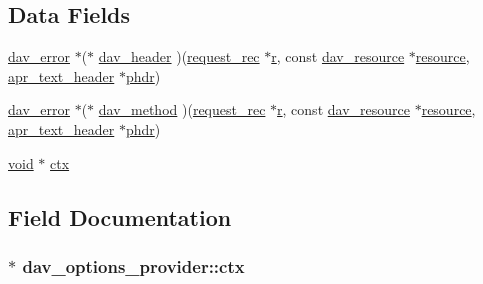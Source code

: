 \subsection*{Data Fields}
\begin{DoxyCompactItemize}
\item 
\hyperlink{structdav__error}{dav\+\_\+error} $\ast$($\ast$ \hyperlink{structdav__options__provider_a3da58aa5f6bc72ca913ff4bd7458c9f2}{dav\+\_\+header} )(\hyperlink{structrequest__rec}{request\+\_\+rec} $\ast$\hyperlink{pcregrep_8txt_a2e9e9438b26c0bb4425367a7e4f75eb3}{r}, const \hyperlink{structdav__resource}{dav\+\_\+resource} $\ast$\hyperlink{group__APR__Util__RL_gaa6244aacafcc4ec1d0727bdb32614b11}{resource}, \hyperlink{structapr__text__header}{apr\+\_\+text\+\_\+header} $\ast$\hyperlink{group__MOD__DAV_ga08f35dafe4ef680fc79b6e69d71c8f90}{phdr})
\item 
\hyperlink{structdav__error}{dav\+\_\+error} $\ast$($\ast$ \hyperlink{structdav__options__provider_ac1ff422a3f04c5d02ae61b90a8478856}{dav\+\_\+method} )(\hyperlink{structrequest__rec}{request\+\_\+rec} $\ast$\hyperlink{pcregrep_8txt_a2e9e9438b26c0bb4425367a7e4f75eb3}{r}, const \hyperlink{structdav__resource}{dav\+\_\+resource} $\ast$\hyperlink{group__APR__Util__RL_gaa6244aacafcc4ec1d0727bdb32614b11}{resource}, \hyperlink{structapr__text__header}{apr\+\_\+text\+\_\+header} $\ast$\hyperlink{group__MOD__DAV_ga08f35dafe4ef680fc79b6e69d71c8f90}{phdr})
\item 
\hyperlink{group__MOD__ISAPI_gacd6cdbf73df3d9eed42fa493d9b621a6}{void} $\ast$ \hyperlink{structdav__options__provider_a78ab3943bfacc2b6b8bc59cec9eefc16}{ctx}
\end{DoxyCompactItemize}


\subsection{Field Documentation}
\subsubsection[{\texorpdfstring{ctx}{ctx}}]{$\ast$ dav\+\_\+options\+\_\+provider\+::ctx}\hypertarget{structdav__options__provider_a78ab3943bfacc2b6b8bc59cec9eefc16}{}\label{structdav__options__provider_a78ab3943bfacc2b6b8bc59cec9eefc16}
